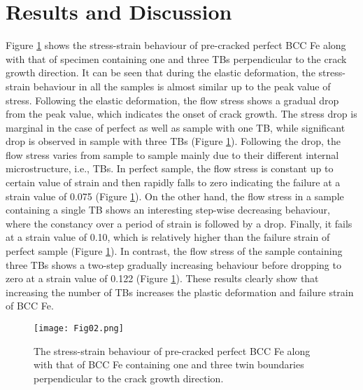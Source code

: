 \documentclass[smallextended]{svjour3}       %
\begin{document}
\section{Results and Discussion}
\label{Results}

Figure \ref{Stress-strain} shows the stress-strain behaviour of pre-cracked perfect BCC Fe along with that of specimen 
containing one and three TBs perpendicular to the crack growth direction. It can be seen that during the elastic deformation, 
the stress-strain behaviour in all the samples is almost similar up to the peak value of stress. Following the elastic 
deformation, the flow stress shows a gradual drop from the peak value, which indicates the onset of crack growth. The 
stress drop is marginal in the case of perfect as well as sample with one TB, while significant drop is observed in sample 
with three TBs (Figure \ref{Stress-strain}). Following the drop, the flow stress varies from sample to sample mainly due to 
their different internal microstructure, i.e., TBs. In perfect sample, the flow stress is constant up to certain value of 
strain and then rapidly falls to zero indicating the failure at a strain value of 0.075 (Figure \ref{Stress-strain}). On the 
other hand, the flow stress in a sample containing a single TB shows an interesting step-wise decreasing behaviour, where 
the constancy over a period of strain is followed by a drop. Finally, it fails at a strain value of 0.10, which is relatively 
higher than the failure strain of perfect sample (Figure \ref{Stress-strain}). In contrast, the flow stress of the sample 
containing three TBs shows a two-step gradually increasing behaviour before dropping to zero at a strain value of 0.122 
(Figure \ref{Stress-strain}). These results clearly show that increasing the number of TBs increases the plastic deformation 
and failure strain of BCC Fe. 

\begin{figure}
\centering
\texttt{[image: Fig02.png]}
\caption {\small The stress-strain behaviour of pre-cracked perfect BCC Fe along with that of BCC Fe containing one and three 
twin boundaries perpendicular to the crack growth direction.}
\label{Stress-strain}
\end{figure}
\end{document}
